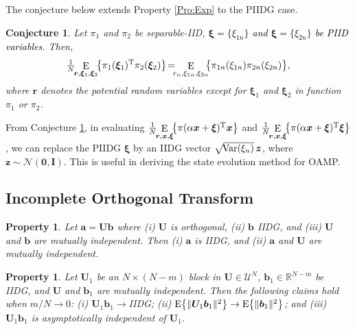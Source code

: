 \documentclass[journal]{IEEEtran}
\newcommand{\mr}{\mathrm}
\newcommand{\BE}{\begin{equation}}
\newcommand{\EE}{\end{equation}}
\renewcommand{\bf}{\bm}
\newcommand{\bb}{\mathbb}
\renewcommand{\cal}{\mathcal}
\newtheorem{property}[theorem]{Property}
\newtheorem{conjecture}[theorem]{Conjecture}
\newcommand{\LLC}[1]{\textcolor{black}{#1}}%
\begin{document}
  The conjecture below extends Property \ref{Pro:Exp} to the PIIDG case. 

\begin{conjecture}\label{Conj:E_Var}
Let $\pi_1$ and $\pi_2$ be separable-IID,  \LLC{$\bf{\xi}=\{\xi_{1n}\}$ and $\bf{\xi}=\{\xi_{2n}\}$ be PIID  variables}. Then, 
\BE 
\tfrac{1}{N}\!\! \mathop\mr{E}\limits_{\bf{r},\bf{\xi}_1,\bf{\xi}_2}\!\!\big\{  \pi_1(\bf{\xi}_1)^{\rm T} \pi_2(\bf{\xi}_2)\big\} \!= \!\!\! \mathop\mr{E}\limits_{r_n,\xi_{1n},\xi_{2n}}\!\!\!\big\{ \pi_{1n}(\xi_{1n}) \pi_{2n}(\xi_{2n}) \big\},
\EE
where $\bf{r}$ denotes the potential random variables except for $\bf{\xi}_1$ and $\bf{\xi}_2$ in function $\pi_1 $ or $\pi_2 $. 
\end{conjecture}

From Conjecture \ref{Conj:E_Var}, in evaluating $\tfrac{1}{N}\!\! \mathop\mr{E}\limits_{\bf{r},\bf{x},\bf{\xi}}\!\!\big\{  \pi(\alpha \bf{x} +  \bf{\xi})^{\rm T} {\bf{x}}\big\}$ and $\tfrac{1}{N}\!\! \mathop\mr{E}\limits_{\bf{r},\bf{x},\bf{\xi}}\!\!\big\{  \pi(\alpha \bf{x} +  \bf{\xi})^{\rm T} {\bf{\xi}}\big\}$, we can replace the PIIDG $\bf{\xi}$ by an IIDG vector $\sqrt{\! {\rm Var} (\xi_n) }\,\bf{z}$, where $\bf{z}\sim \mathcal{N}(\bf{0},\bf{I})$. This is useful in deriving the state evolution method for OAMP.




\subsection{Incomplete Orthogonal Transform}\label{APP:orth_trans} 

\begin{property}\label{Lem:VT_Gau}
  Let $\bf{a}=\bf{Ub}$ where (i) $\bf{U}$ is orthogonal, (ii) $\bf{b}$ IIDG, and (iii) $\bf{U}$ and $\bf{b}$ are mutually independent. Then (i) $\bf{a}$ is IIDG, and (ii) $\bf{a}$ and $\bf{U}$ are mutually independent.
\end{property}
 

 
\begin{property}\label{Lem:part_U_IIDG}
    Let $\bf{U}_1$ be an $N\times(N-m)$ block in $\bf{U}\in\bf{\cal{U}}^N$, $\bf{b}_1\in\bb{R}^{N-m}$ be IIDG, and $\bf{U}$ and $\bf{b}_1$ are mutually independent. Then the following claims hold when $m/N\to0$: (i) $\bf{U}_1\bf{b}_1\to$IIDG; (ii) ${\rm E}\big\{\|\bf{U}_1\bf{b}_1\|^2\big\} \to {\rm E}\big\{\|\bf{b}_1\|^2\big\}$; and (iii) $\bf{U}_1\bf{b}_1$ is asymptotically independent of $\bf{U}_1$. 
\end{property}
\end{document}
